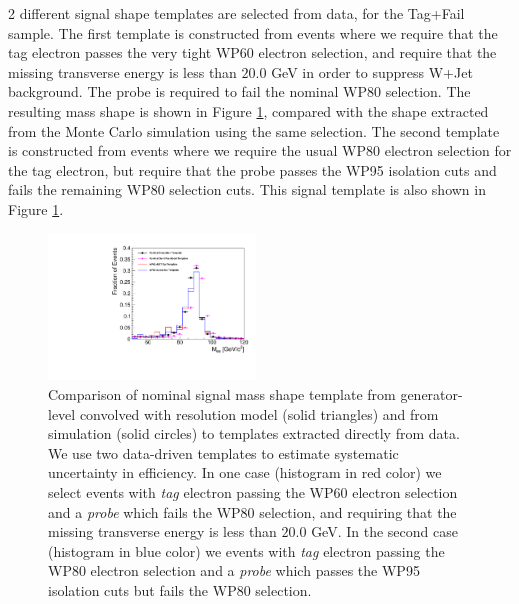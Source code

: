 2 different signal shape templates are selected from data, for the Tag+Fail sample. The first template is constructed from events where we require that the tag electron passes the very tight WP60 electron selection, and require that the missing transverse energy is less than $20.0$ GeV in order to suppress W+Jet background. The probe is required to fail the nominal WP80 selection. The resulting mass shape is shown in Figure \ref{fig:DataSignalTemplate_RecoFailWP80}, compared with the shape extracted from the Monte Carlo simulation using the same selection. The second template is constructed from events where we require the usual WP80 electron selection for the tag electron, but require that the probe passes the WP95 isolation cuts and fails the remaining WP80 selection cuts. This signal template is also shown in Figure \ref{fig:DataSignalTemplate_RecoFailWP80}. 
\begin{figure}[htb]
  \begin{center}
    \includegraphics[width=0.49\textwidth]{DataSignalTemplate_Comparison.pdf}%
    \caption{Comparison of nominal signal mass shape template from generator-level convolved with resolution 
    model (solid triangles) and from simulation (solid circles) to 
    templates extracted directly from data. We use two data-driven templates to estimate systematic 
     uncertainty in efficiency. In one case (histogram in red color) we select events with \textit{tag} 
     electron passing the WP60 electron selection and a \textit{probe} which fails the WP80 selection, 
     and requiring that the missing transverse energy is less than $20.0$ GeV.  
     In the second case (histogram in blue color) we events with \textit{tag} electron passing the 
     WP80 electron selection and a \textit{probe} which passes the WP95 isolation cuts but fails 
     the WP80 selection.}
    \label{fig:DataSignalTemplate_RecoFailWP80}
  \end{center}
\end{figure}
